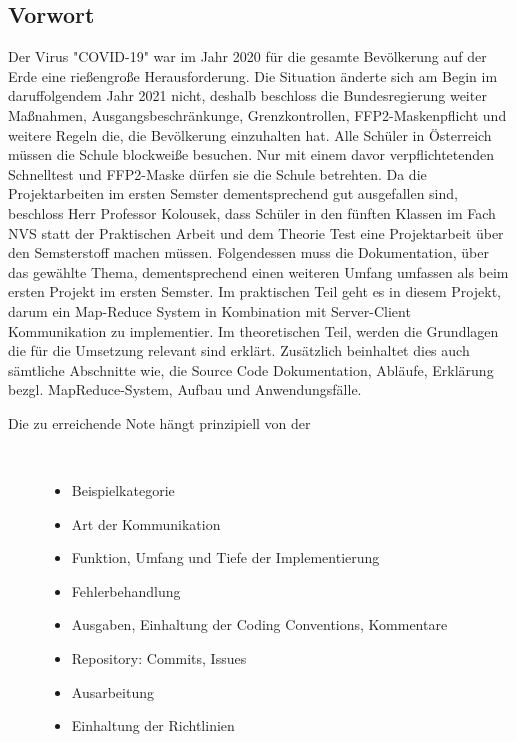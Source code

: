 \documentclass[a4paper,12pt]{article}
\begin{document}
\subsection{Vorwort}
Der Virus "COVID-19" war im Jahr 2020 für die gesamte Bevölkerung auf der Erde eine rießengroße Herausforderung. Die Situation änderte sich am Begin im daruffolgendem Jahr 2021 nicht, 
deshalb beschloss die Bundesregierung weiter Maßnahmen, Ausgangsbeschränkunge, Grenzkontrollen, FFP2-Maskenpflicht und weitere Regeln die, die Bevölkerung einzuhalten hat. Alle Schüler in Österreich müssen die Schule 
blockweiße besuchen. Nur mit einem davor verpflichtetenden Schnelltest und FFP2-Maske dürfen sie die Schule betrehten. Da die Projektarbeiten im ersten Semster dementsprechend gut ausgefallen sind, beschloss Herr Professor 
Kolousek, dass Schüler in den fünften Klassen im Fach NVS statt der Praktischen Arbeit und dem Theorie Test eine Projektarbeit über den Semsterstoff machen müssen. Folgendessen muss die Dokumentation, über das gewählte Thema, dementsprechend einen
weiteren Umfang umfassen als beim ersten Projekt im ersten Semster. Im praktischen Teil geht es in diesem Projekt, darum ein Map-Reduce System in Kombination mit Server-Client Kommunikation zu implementier. Im theoretischen Teil, werden die Grundlagen die für die 
Umsetzung relevant sind erklärt. Zusätzlich beinhaltet dies auch sämtliche Abschnitte wie, die Source Code Dokumentation, Abläufe, Erklärung bezgl. MapReduce-System, Aufbau und Anwendungsfälle.
\begin{description}
    \item[Die zu erreichende Note hängt prinzipiell von der] ~\par
    \begin{itemize}
        \item Beispielkategorie
        \item Art der Kommunikation
        \item Funktion, Umfang und Tiefe der Implementierung
        \item Fehlerbehandlung
        \item Ausgaben, Einhaltung der Coding Conventions, Kommentare
        \item Repository: Commits, Issues
        \item Ausarbeitung
        \item Einhaltung der Richtlinien
      
    \end{itemize} 
\end{description}
\end{document}
